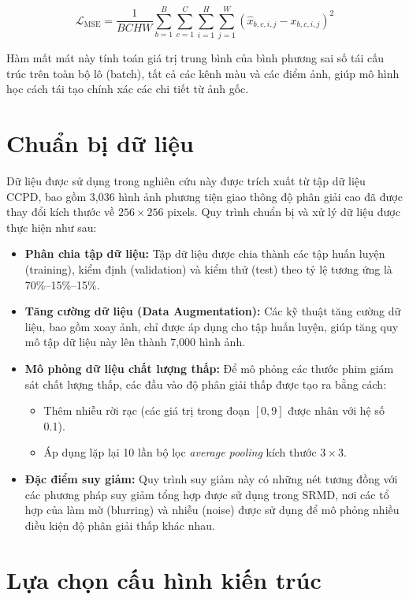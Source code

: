 \begin{equation}
    \mathcal{L}_{\text{MSE}} = \frac{1}{BCHW} \sum_{b=1}^{B} \sum_{c=1}^{C} \sum_{i=1}^{H} \sum_{j=1}^{W} (\hat{x}_{b,c,i,j} - x_{b,c,i,j})^2
\end{equation}

Hàm mất mát này tính toán giá trị trung bình của bình phương sai số tái cấu trúc trên toàn bộ lô (batch), tất cả các kênh màu và các điểm ảnh, giúp mô hình học cách tái tạo chính xác các chi tiết từ ảnh gốc.


\section{Chuẩn bị dữ liệu}
Dữ liệu được sử dụng trong nghiên cứu này được trích xuất từ tập dữ liệu CCPD, bao gồm 3,036 hình ảnh phương tiện giao thông độ phân giải cao đã được thay đổi kích thước về $256 \times 256$ pixels. Quy trình chuẩn bị và xử lý dữ liệu được thực hiện như sau:

\begin{itemize}
    \item \textbf{Phân chia tập dữ liệu:} Tập dữ liệu được chia thành các tập huấn luyện (training), kiểm định (validation) và kiểm thử (test) theo tỷ lệ tương ứng là 70\%--15\%--15\%.
    \item \textbf{Tăng cường dữ liệu (Data Augmentation):} Các kỹ thuật tăng cường dữ liệu, bao gồm xoay ảnh, chỉ được áp dụng cho tập huấn luyện, giúp tăng quy mô tập dữ liệu này lên thành 7,000 hình ảnh.
    \item \textbf{Mô phỏng dữ liệu chất lượng thấp:} Để mô phỏng các thước phim giám sát chất lượng thấp, các đầu vào độ phân giải thấp được tạo ra bằng cách:
    \begin{itemize}
        \item Thêm nhiễu rời rạc (các giá trị trong đoạn $[0, 9]$ được nhân với hệ số 0.1).
        \item Áp dụng lặp lại 10 lần bộ lọc \textit{average pooling} kích thước $3 \times 3$.
    \end{itemize}
    \item \textbf{Đặc điểm suy giảm:} Quy trình suy giảm này có những nét tương đồng với các phương pháp suy giảm tổng hợp được sử dụng trong SRMD, nơi các tổ hợp của làm mờ (blurring) và nhiễu (noise) được sử dụng để mô phỏng nhiều điều kiện độ phân giải thấp khác nhau.
\end{itemize}


\section{Lựa chọn cấu hình kiến trúc}
\label{sec:cau_hinh_kien_truc}

